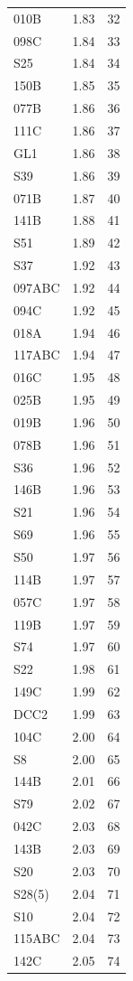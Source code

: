 \begin{longtable}{lrr}
  010B & 1.83 & 32 \\
  098C & 1.84 & 33 \\
  S25 & 1.84 & 34 \\
  150B & 1.85 & 35 \\
  077B & 1.86 & 36 \\
  111C  & 1.86 & 37 \\
  GL1 & 1.86 & 38 \\
  S39 & 1.86 & 39 \\
  071B & 1.87 & 40 \\
  141B & 1.88 & 41 \\
  S51 & 1.89 & 42 \\
  S37 & 1.92 & 43 \\
  097ABC & 1.92 & 44 \\
  094C & 1.92 & 45 \\
  018A & 1.94 & 46 \\
  117ABC & 1.94 & 47 \\
  016C & 1.95 & 48 \\
  025B & 1.95 & 49 \\
  019B & 1.96 & 50 \\
  078B & 1.96 & 51 \\
  S36 & 1.96 & 52 \\
  146B & 1.96 & 53 \\
  S21 & 1.96 & 54 \\
  S69 & 1.96 & 55 \\
  S50 & 1.97 & 56 \\
  114B & 1.97 & 57 \\
  057C & 1.97 & 58 \\
  119B & 1.97 & 59 \\
  S74 & 1.97 & 60 \\
  S22 & 1.98 & 61 \\
  149C & 1.99 & 62 \\
  DCC2 & 1.99 & 63 \\
  104C & 2.00 & 64 \\
  S8 & 2.00 & 65 \\
  144B & 2.01 & 66 \\
  S79 & 2.02 & 67 \\
  042C & 2.03 & 68 \\
  143B & 2.03 & 69 \\
  S20 & 2.03 & 70 \\
  S28(5) & 2.04 & 71 \\
  S10 & 2.04 & 72 \\
  115ABC & 2.04 & 73 \\
  142C & 2.05 & 74 \\

\end{longtable}
